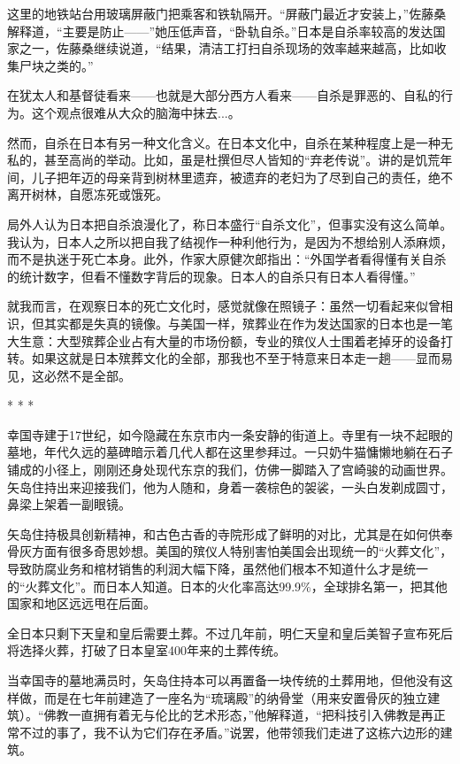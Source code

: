 \documentclass[12pt,oneside]{book}
\begin{document}
\begin{bookref}[frametitle={\cite{好好告别：世界葬礼观察手记}}]
这里的地铁站台用玻璃屏蔽门把乘客和铁轨隔开。“屏蔽门最近才安装上，”佐藤桑解释道，“主要是防止——”她压低声音，“卧轨自杀。”日本是自杀率较高的发达国家之一，佐藤桑继续说道，“结果，清洁工打扫自杀现场的效率越来越高，比如收集尸块之类的。”

在犹太人和基督徒看来——也就是大部分西方人看来——自杀是罪恶的、自私的行为。这个观点很难从大众的脑海中抹去...。

然而，自杀在日本有另一种文化含义。在日本文化中，自杀在某种程度上是一种无私的，甚至高尚的举动。比如，虽是杜撰但尽人皆知的“弃老传说”。讲的是饥荒年间，儿子把年迈的母亲背到树林里遗弃，被遗弃的老妇为了尽到自己的责任，绝不离开树林，自愿冻死或饿死。

局外人认为日本把自杀浪漫化了，称日本盛行“自杀文化”，但事实没有这么简单。我认为，日本人之所以把自我了结视作一种利他行为，是因为不想给别人添麻烦，而不是执迷于死亡本身。此外，作家大原健次郎指出：“外国学者看得懂有关自杀的统计数字，但看不懂数字背后的现象。日本人的自杀只有日本人看得懂。”

就我而言，在观察日本的死亡文化时，感觉就像在照镜子：虽然一切看起来似曾相识，但其实都是失真的镜像。与美国一样，殡葬业在作为发达国家的日本也是一笔大生意：大型殡葬企业占有大量的市场份额，专业的殡仪人士围着老掉牙的设备打转。如果这就是日本殡葬文化的全部，那我也不至于特意来日本走一趟——显而易见，这必然不是全部。

\begin{center}
* * *
\end{center}

幸国寺建于17世纪，如今隐藏在东京市内一条安静的街道上。寺里有一块不起眼的墓地，年代久远的墓碑暗示着几代人都在这里参拜过。一只奶牛猫慵懒地躺在石子铺成的小径上，刚刚还身处现代东京的我们，仿佛一脚踏入了宫崎骏的动画世界。矢岛住持出来迎接我们，他为人随和，身着一袭棕色的袈裟，一头白发剃成圆寸，鼻梁上架着一副眼镜。

矢岛住持极具创新精神，和古色古香的寺院形成了鲜明的对比，尤其是在如何供奉骨灰方面有很多奇思妙想。美国的殡仪人特别害怕美国会出现统一的“火葬文化”，导致防腐业务和棺材销售的利润大幅下降，虽然他们根本不知道什么才是统一的“火葬文化”。而日本人知道。日本的火化率高达99.9\%，全球排名第一，把其他国家和地区远远甩在后面。

全日本只剩下天皇和皇后需要土葬。不过几年前，明仁天皇和皇后美智子宣布死后将选择火葬，打破了日本皇室400年来的土葬传统。

当幸国寺的墓地满员时，矢岛住持本可以再置备一块传统的土葬用地，但他没有这样做，而是在七年前建造了一座名为“琉璃殿”的纳骨堂（用来安置骨灰的独立建筑）。“佛教一直拥有着无与伦比的艺术形态，”他解释道，“把科技引入佛教是再正常不过的事了，我不认为它们存在矛盾。”说罢，他带领我们走进了这栋六边形的建筑。


\end{bookref}
\end{document}
